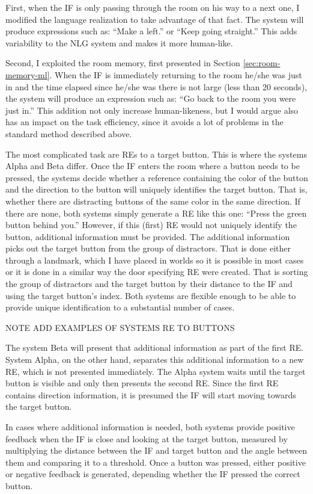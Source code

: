 First, when the IF is only passing through the room on his way to a next one, I modified the language realization to take advantage of that fact. The system will produce expressions such as: ``Make a left.'' or ``Keep going straight.'' This adds variability to the NLG system and makes it more human-like.

Second, I exploited the room memory, first presented in Section \ref{sec:room-memory-ml}. When the IF is immediately returning to the room he/she was just in and the time elapsed since he/she was there is not large (less than 20 seconds), the system will produce an expression such as: ``Go back to the room you were just in.'' This addition not only increase human-likeness, but I would argue also has an impact on the task efficiency, since it avoids a lot of problems in the standard method described above.

The most complicated task are REs to a target button. This is where the systems Alpha and Beta differ. Once the IF enters the room where a button needs to be pressed, the systems decide whether a reference containing the color of the button and the direction to the button will uniquely identifies the target button. That is, whether there are distracting buttons of the same color in the same direction. If there are none, both systems simply generate a RE like this one: ``Press the green button behind you.'' However, if this (first) RE would not uniquely identify the button, additional information must be provided. The additional information picks out the target button from the group of distractors. That is done either through a landmark, which I have placed in worlds so it is possible in most cases or it is done in a similar way the door specifying RE were created. That is sorting the group of distractors and the target button by their distance to the IF and using the target button's index. Both systems are flexible enough to be able to provide unique identification to a substantial number of cases.

NOTE ADD EXAMPLES OF SYSTEMS RE TO BUTTONS

The system Beta will present that additional information as part of the first RE. System Alpha, on the other hand, separates this additional information to a new RE, which is not presented immediately. The Alpha system waits until the target button is visible and only then presents the second RE. Since the first RE contains direction information, it is presumed the IF will start moving towards the target button.

In cases where additional information is needed, both systems provide positive feedback when the IF is close and looking at the target button, measured by multiplying the distance between the IF and target button and the angle between them and comparing it to a threshold. Once a button was pressed, either positive or negative feedback is generated, depending whether the IF pressed the correct button.

